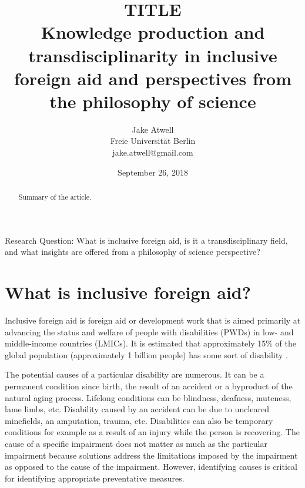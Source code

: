 \documentclass[a4paper]{article}
\begin{document}
\title{TITLE\\
Knowledge production and transdisciplinarity in inclusive foreign aid and perspectives from the
philosophy of science}
\author{Jake Atwell\\Freie Universität Berlin\\jake.atwell@gmail.com}
\date{September 26, 2018}

\maketitle



\begin{abstract}
Summary of the article.
\end{abstract}
\newpage

\noindent Research Question: What is inclusive foreign aid, is it a
transdisciplinary field, and what insights are offered from a philosophy of
science perspective?

\tableofcontents

\newpage
{} %




\section{What is inclusive foreign aid?}

Inclusive foreign aid is foreign aid or development work that is aimed
primarily at advancing the status and welfare of people with disabilities
(PWDs) in low- and middle-income countries (LMICs). It is estimated that
approximately 15\% of the global population (approximately 1 billion people)
has some sort of disability \citep{banks2017poverty}.

The potential causes of a particular disability are numerous. It can be a
permanent condition since birth, the result of an accident or a byproduct of
the natural aging process. Lifelong conditions can be blindness, deafness,
muteness, lame limbs, etc. Disability caused by an accident can be due to
uncleared minefields, an amputation, trauma, etc. Disabilities can also be
temporary conditions for example as a result of an injury while the person is
recovering. The cause of a specific impairment does not matter as much as the
particular impairment because solutions address the limitations imposed by the
impairment as opposed to the cause of the impairment. However, identifying
causes is critical for identifying appropriate preventative measures.
\end{document}
